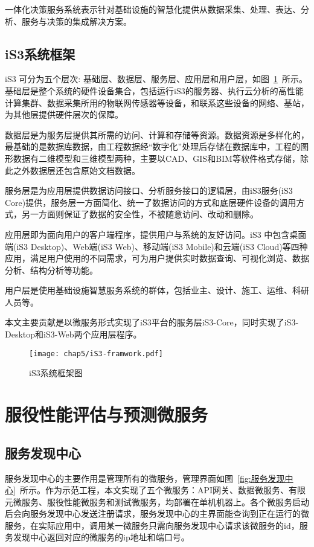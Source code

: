 一体化决策服务系统表示针对基础设施的智慧化提供从数据采集、处理、表达、分析、服务与决策的集成解决方案。

\subsection{iS3系统框架}

iS3 可分为五个层次: 基础层、数据层、服务层、应用层和用户层，如图~\ref{fig:iS3系统框架图}~所示。基础层是整个系统的硬件设备集合，包括运行iS3的服务器、执行云分析的高性能计算集群、数据采集所用的物联网传感器等设备，和联系这些设备的网络、基站，为其他层提供硬件层次的保障。

数据层是为服务层提供其所需的访问、计算和存储等资源。数据资源是多样化的，最基础的是数据库数据，由工程数据经“数字化”处理后存储在数据库中，工程的图形数据有二维模型和三维模型两种，主要以CAD、GIS和BIM等软件格式存储，除此之外数据层还包含原始文档数据。

服务层是为应用层提供数据访问接口、分析服务接口的逻辑层，由iS3服务(iS3 Core)提供，服务层一方面简化、统一了数据访问的方式和底层硬件设备的调用方式，另一方面则保证了数据的安全性，不被随意访问、改动和删除。

应用层即为面向用户的客户端程序，提供用户与系统的友好访问。iS3 中包含桌面端(iS3 Desktop)、Web端(iS3 Web)、移动端(iS3 Mobile)和云端(iS3 Cloud)等四种应用，满足用户使用的不同需求，可为用户提供实时数据查询、可视化浏览、数据分析、结构分析等功能。

用户层是使用基础设施智慧服务系统的群体，包括业主、设计、施工、运维、科研人员等。

本文主要贡献是以微服务形式实现了iS3平台的服务层iS3-Core，同时实现了iS3-Desktop和iS3-Web两个应用层程序。

\begin{figure}[htb!]
    \centering
    \texttt{[image: chap5/iS3-framwork.pdf]}
    \caption{iS3系统框架图}
    \label{fig:iS3系统框架图}
\end{figure}

\section{服役性能评估与预测微服务}

\subsection{服务发现中心}

服务发现中心的主要作用是管理所有的微服务，管理界面如图~\ref{fig:服务发现中心}~所示。作为示范工程，本文实现了五个微服务：API网关、数据微服务、有限元微服务、服役性能微服务和测试微服务，均部署在单机机器上。各个微服务启动后会向服务发现中心发送注册请求，服务发现中心的主界面能查询到正在运行的微服务，在实际应用中，调用某一微服务只需向服务发现中心请求该微服务的id，服务发现中心返回对应的微服务的ip地址和端口号。

